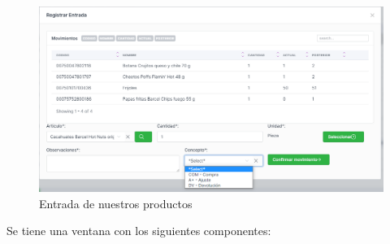 \documentclass[a4paper,DIV=12]{scrreprt}
\begin{document}
	
		\begin{figure}[!htb]
		\centering
		\includegraphics[scale=0.4]{ENTRADA.PNG}
		\caption{Entrada de nuestros productos}
	\end{figure}
Se tiene una ventana con los siguientes componentes: \\
\end{document}
